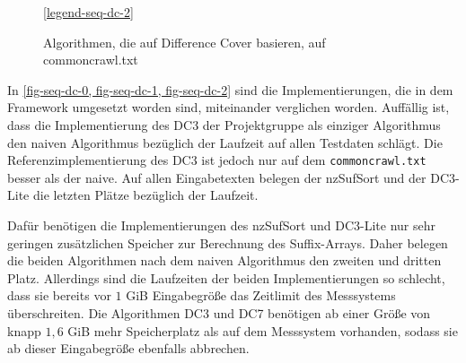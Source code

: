 \begin{figure}[ht]

    \medskip
    \ref{legend-seq-dc-2}
    \caption{Algorithmen, die auf Difference Cover basieren, auf commoncrawl.txt}
    \label{fig-seq-dc-2}
\end{figure}
\FloatBarrier

In \cref{fig-seq-dc-0, fig-seq-dc-1, fig-seq-dc-2} sind die Implementierungen, die in dem \sacabench Framework umgesetzt worden sind, miteinander verglichen worden. Auffällig ist, dass die Implementierung des DC3 der Projektgruppe als einziger Algorithmus den naiven Algorithmus bezüglich der Laufzeit auf allen Testdaten schlägt. Die Referenzimplementierung des DC3 ist jedoch nur auf dem \texttt{commoncrawl.txt} besser als der naive. Auf allen Eingabetexten belegen der nzSufSort und der DC3-Lite die letzten Plätze bezüglich der Laufzeit.

Dafür benötigen die Implementierungen des nzSufSort und DC3-Lite nur sehr geringen zusätzlichen Speicher zur Berechnung des Suffix-Arrays. Daher belegen die beiden Algorithmen nach dem naiven Algorithmus den zweiten und dritten Platz. Allerdings sind die Laufzeiten der beiden Implementierungen so schlecht, dass sie bereits vor $1$ GiB Eingabegröße das Zeitlimit des Messsystems überschreiten. Die Algorithmen DC3 und DC7 benötigen ab einer Größe von knapp $1,6$ GiB mehr Speicherplatz als auf dem Messsystem vorhanden, sodass sie ab dieser Eingabegröße ebenfalls abbrechen.

